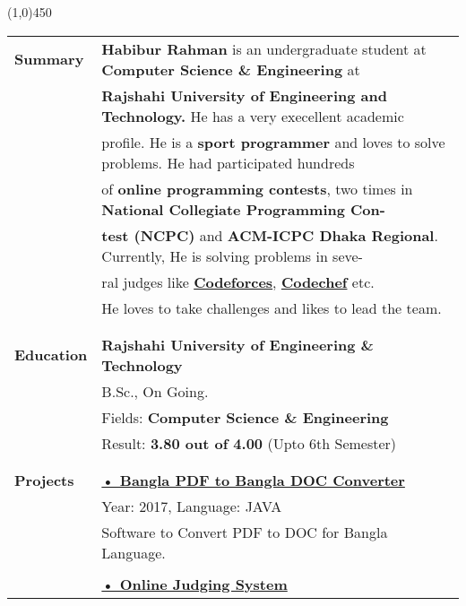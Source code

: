 \documentclass[letterpaper,11pt,oneside]{article}
\begin{document}
\vspace{-1ex}
{\line(1,0){450}}
\vspace{1ex}
\vspace{1cm}
\noindent \begin{tabular}{@{} l l}
 \Large{\textbf{Summary}}	& \textbf{Habibur Rahman } is an undergraduate student at \textbf{ Computer  Science  \& Engineering}  at\\
	& \textbf{Rajshahi University  of Engineering and  Technology. } He has a very execellent academic\\
	&  profile. He is a \textbf{sport programmer} and loves to solve problems. He had participated hundreds \\
	&  of \textbf{online programming contests}, two times in \textbf{National Collegiate Programming Con-}\\
	& \textbf{test (NCPC)} and \textbf{ACM-ICPC Dhaka Regional}. Currently, He is solving problems in seve-\\
	&  ral judges like \href{http://codeforces.com/profile/habib_rahman}{\textbf{Codeforces}}, \href{https://www.codechef.com/users/habib_ruet}{\textbf{Codechef}} etc. \\
	& He loves to take challenges and likes to lead the team.\\ 
 \\
 \\
 \Large{\textbf{Education}}    & \textbf{Rajshahi University of Engineering \& Technology} \\
     & B.Sc., On Going. \\
     & Fields:\textbf{ Computer Science \& Engineering} \\
     & Result: \textbf{3.80 out of 4.00} (Upto 6th Semester)\\
     \\
     \\
 \Large{\textbf{Projects}}    &  \href{https://github.com/habibrahmanbd/BanglaPDFtoBanglaDOC}{\textbf{• Bangla PDF to Bangla DOC Converter}} \\
 	& Year: 2017, Language: JAVA\\
    & \parbox{5.0in}{Software to Convert PDF to DOC for Bangla Language.}\\
    & \\
    & \href{https://github.com/habibrahmanbd/onlinelabsystem}{\textbf{• Online Judging System}}\\

\end{tabular}
\end{document}
